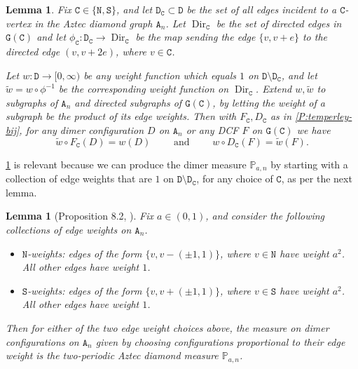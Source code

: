 \documentclass[11pt,twoside]{amsart}
\theoremstyle{plain}
\newtheorem{lem}[thm]{Lemma}
\numberwithin{quest}{section}
\theoremstyle{remark}
\numberwithin{rem}{section}
\theoremstyle{definition}
\renewcommand{\tt}[1]{{\mathtt{#1}}}
\begin{document}
	\begin{lem}
		\label{L:path-weights}
		Fix $\tt{C} \in \{\tt{N}, \tt{S}\}$, and let $\tt{D}_\tt{C} \subset \tt{D}$ be the set of all edges incident to a $\tt{C}$-vertex in the Aztec diamond graph $\tt{A}_n$. Let $\operatorname{Dir}_\tt{C}$ be the set of directed edges in $\tt{G}(\tt{C})$ and let $\phi_{\tt{C}}:\tt{D}_\tt{C} \to \operatorname{Dir}_\tt{C}$ be the map sending the edge $\{v, v + e\}$ to the directed edge $(v, v + 2e)$, where $v \in \tt{C}$.
		
		Let $w:\tt{D} \to [0, \infty)$ be any weight function which equals $1$ on $\tt{D} \setminus \tt{D}_\tt{C}$, and let $\tilde w = w \circ \phi^{-1}$ be the corresponding weight function on $\operatorname{Dir}_\tt{C}$. Extend $w, \tilde w$ to subgraphs of $\tt{A}_n$ and directed subgraphs of $\tt{G}(\tt{C})$, by letting the weight of a subgraph be the product of its edge weights. Then with $F_\tt{C}, D_\tt{C}$ as in \cref{P:temperley-bij}, for any dimer configuration $D$ on $\tt{A}_n$ or any DCF $F$ on $\tt{G}(\tt{C})$ we have
		$$
		\tilde w \circ F_\tt{C}(D) = w(D) \qquad \text{ and } \qquad w \circ D_\tt{C}(F) = \tilde w(F).
		$$
	\end{lem}
	
	\cref{L:path-weights} is relevant because we can produce the dimer measure $\mathbb P_{a, n}$ by starting with a collection of edge weights that are $1$ on $\tt{D} \setminus \tt{D_C}$, for any choice of $\tt{C}$, as per the next lemma.
	
	\begin{lem}[Proposition 8.2, \cite{BCJ22}]
		\label{L:gauge} 
		Fix $a \in (0, 1)$, and consider the following collections of edge weights on $\tt{A}_n$.
		\begin{itemize}[nosep]
			\item $\tt{N}$-weights: edges of the form $\{v, v - (\pm 1, 1)\}$, where $v \in \tt{N}$ have weight $a^{2}$. All other edges have weight $1$.
			\item $\tt{S}$-weights: edges of the form $\{v, v + (\pm 1, 1)\}$, where $v \in \tt{S}$ have weight $a^{2}$. All other edges have weight $1$.


		\end{itemize}
		Then for either of the two edge weight choices above, the measure on dimer configurations on $\tt{A}_n$ given by choosing configurations proportional to their edge weight is the two-periodic Aztec diamond measure $\mathbb P_{a, n}$. 
	\end{lem}
	
\end{document}
